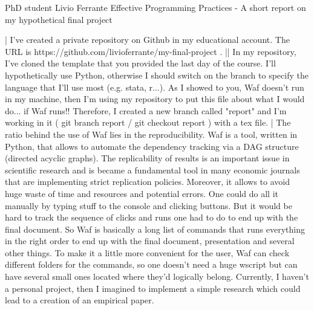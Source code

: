 \documentclass{article}
\begin{document}
PhD student Livio Ferrante
Effective Programming Practices - A short report on my hypothetical final project

|
I've created a private repository on Github in my educational account. The URL is https://github.com/livioferrante/my-final-project .
||
In my repository, I've cloned the template that you provided the last day of the course. I'll hypothetically use Python, otherwise I should switch on the branch to specify the language that I'll use most (e.g. stata, r...).
As I showed to you, Waf doesn't run in my machine, then I'm using my repository to put this file about what I would do... if Waf runs!! Therefore, I created a new branch called "report" and I'm working in it  ( git branch report   /   git checkout report ) with a tex file.
|
The ratio behind the use of Waf lies in the reproducibility. Waf is a tool, written in Python, that allows to automate the dependency tracking via a DAG structure (directed acyclic graphs). The replicability of results is an important issue in scientific research and is became a fundamental tool in many economic journals that are implementing strict replication policies. Moreover, it allows to avoid huge waste of time and resources and potential errors.
One could do all it manually by typing stuff to the console and clicking buttons. But it would be hard to track the sequence of clicks and runs one had to do to end up with the final document. So Waf is basically a long list of commands that runs everything in the right order to end up with the final document, presentation and several other things. To make it a little more convenient for the user, Waf can check different folders for the commands, so one doesn't need a huge wscript but can have several small ones located where they'd logically belong.
Currently, I haven't a personal project, then I imagined to implement a simple research which could lead to a creation of an empirical paper.
\end{document}
